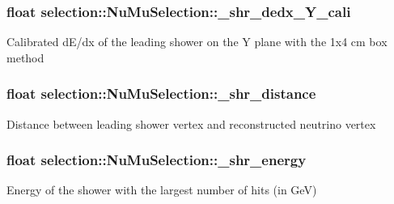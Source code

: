 \subsubsection[{\texorpdfstring{\+\_\+shr\+\_\+dedx\+\_\+\+Y\+\_\+cali}{_shr_dedx_Y_cali}}]{\setlength{\rightskip}{0pt plus 5cm}float selection\+::\+Nu\+Mu\+Selection\+::\+\_\+shr\+\_\+dedx\+\_\+\+Y\+\_\+cali\hspace{0.3cm}{\ttfamily [private]}}\hypertarget{classselection_1_1NuMuSelection_a086d0bb1635bcd0121a8453c499c0bf4}{}\label{classselection_1_1NuMuSelection_a086d0bb1635bcd0121a8453c499c0bf4}
Calibrated d\+E/dx of the leading shower on the Y plane with the 1x4 cm box method 
\subsubsection[{\texorpdfstring{\+\_\+shr\+\_\+distance}{_shr_distance}}]{\setlength{\rightskip}{0pt plus 5cm}float selection\+::\+Nu\+Mu\+Selection\+::\+\_\+shr\+\_\+distance\hspace{0.3cm}{\ttfamily [private]}}\hypertarget{classselection_1_1NuMuSelection_a2da7e7448ef5334cb3988e5d7be786f3}{}\label{classselection_1_1NuMuSelection_a2da7e7448ef5334cb3988e5d7be786f3}
Distance between leading shower vertex and reconstructed neutrino vertex 
\subsubsection[{\texorpdfstring{\+\_\+shr\+\_\+energy}{_shr_energy}}]{\setlength{\rightskip}{0pt plus 5cm}float selection\+::\+Nu\+Mu\+Selection\+::\+\_\+shr\+\_\+energy\hspace{0.3cm}{\ttfamily [private]}}\hypertarget{classselection_1_1NuMuSelection_a06ebfacd01494668815b794a793e58cf}{}\label{classselection_1_1NuMuSelection_a06ebfacd01494668815b794a793e58cf}
Energy of the shower with the largest number of hits (in GeV) 
